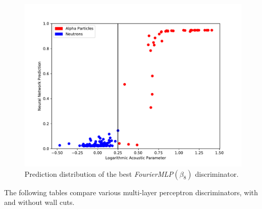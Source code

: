 \documentclass[10pt]{article}
\begin{document}
\begin{figure}[h]
    \centering
    \includegraphics[width=\textwidth]{banded_no_pos_input_hist}
    \caption{\label{banded_no_pos_input_hist} Prediction distribution of the best {\it FourierMLP}$(\beta_{8})$ discriminator.}
\end{figure}

The following tables compare various multi-layer perceptron discriminators, with and without wall cuts.
\end{document}
